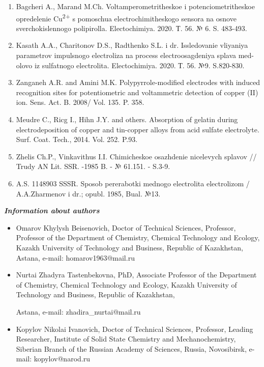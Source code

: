 \begin{enumerate}
\item
Bagcheri A., Marand M.Ch. Voltamperometritheskoe i
potenciometritheskoe opredelenie Cu\textsuperscript{2+} s pomoschua
electrochimitheskogo sensora na osnove sverchokislennogo polipirolla.
Electochimiya. 2020. Т. 56. № 6. S. 483-493.

\item
Kasath A.A., Charitonov D.S., Radthenko S.L. i dr. Issledovanie
vliyaniya parametrov impulsnogo electroliza na process electroosagdeniya
splava med-olovo iz sulfatnogo electrolita. Electochimiya. 2020. Т. 56.
№9. S.820-830.

\item
Zanganeh A.R. and Amini M.K. Polypyrrole-modified electrodes with
induced recognition sites for potentiometric and voltammetric detection
of copper (II) ion. Sens. Act. B. 2008/ Vol. 135. P. 358.

\item
Meudre C., Ricg I., Hihn J.Y. and others. Absorption of gelatin
during electrodeposition of copper and tin-copper alloys from acid
sulfate electrolyte. Surf. Coat. Tech., 2014. Vol. 252. P.93.

\item
Zhelis Ch.P., Vinkavithus I.I. Chimicheskoe osazhdenie nicelevych
splavov // Trudy AN Lit. SSR. -1985 B. - № 61.151. - S.3-9.

\item
A.S. 1148903 SSSR. Sposob pererabotki mednogo electrolita
electrolizom / A.A.Zharmenov i dr.; opubl. 1985, Bual. №13.
\end{enumerate}

\emph{{\bfseries Information about authors}}

\begin{itemize}
\item
Omarov Khylysh Beisenovich, Doctor of Technical Sciences, Professor,
Professor of the Department of Chemistry, Chemical Technology and
Ecology, Kazakh University of Technology and Business, Republic of
Kazakhstan, Astana, e-mail:
homarov1963@mail.ru

\item
Nurtai Zhadyra Tastenbekovna, PhD, Associate Professor of the Department
of Chemistry, Chemical Technology and Ecology, Kazakh University of
Technology and Business, Republic of Kazakhstan,

Astana, e-mail: zhadira\_nurtai@mail.ru

\item
Kopylov Nikolai Ivanovich, Doctor of Technical Sciences, Professor,
Leading Researcher, Institute of Solid State Chemistry and
Mechanochemistry, Siberian Branch of the Russian Academy of Sciences,
Russia, Novosibirsk, e-mail:
kopylov@narod.ru
\end{itemize}

